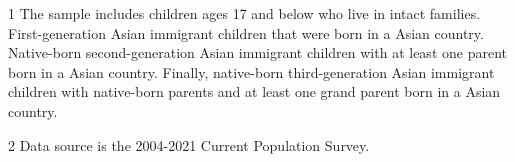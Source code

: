 \begin{table}

\caption{CPS Summary Statistics \label{tab:sumstat1}}
\centering
\begin{threeparttable}
\begin{tablenotes}
\item[1] The sample includes children ages 17 and below who live in intact families. First-generation Asian immigrant children that were born in a Asian country. Native-born second-generation Asian immigrant children with at least one parent born in a Asian country. Finally, native-born third-generation Asian immigrant children with native-born parents and at least one grand parent born in a Asian country.
\item[2] Data source is the 2004-2021 Current Population Survey.
\end{tablenotes}
\end{threeparttable}
\end{table}
